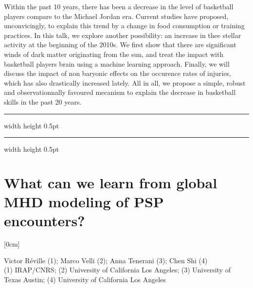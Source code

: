 \documentclass[a4paper,11pt]{book}
\def\doubleline{
\hrule width \hsize height 0.5pt  \kern 1mm \hrule width \hsize height 0.5pt 
}
\begin{document}
  
\vspace{2 mm}
\noindent Within the past 10 years, there has been a decrease in the level of basketball players compare to the Michael Jordan era. Current studies have proposed, unconvicingly, to explain this trend by a change in food consumption or training practices. In this talk, we explore another possibility: an increase in thee stellar activity at the beginning of the 2010s. We first show that there are significant winds of dark matter originating from the sun, and treat the impact with basketball players brain using a machine learning approach. Finally, we will discuss the impact of non baryonic effects on the occurence rates of injuries, which has also drastically increased lately. All in all, we propose a simple, robust and observationnally favoured mecanism to explain the decrease in basketball skills in the past 20 years.

\noindent\doubleline
        
          \section[What can we learn from global MHD modeling of PSP encounters?  \newline(Victor Réville)] { What can we learn from global MHD modeling of PSP encounters?  }



[0cm]



\begin{center}
    
{\large Victor Réville (1)};{ \large  Marco Velli (2)};{ \large  Anna Tenerani (3)};{ \large  Chen Shi (4)}\\
  
\vspace{2 mm}
\noindent (1) IRAP/CNRS; (2)  University of California Los Angeles; (3)  University of Texas Austin; (4)  University of California Los Angeles\\

\end{center}
\end{document}
